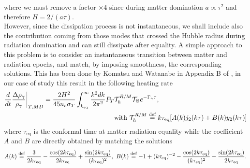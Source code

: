 where we must remove a factor $\times 4$ since during matter domination $a\propto \tau^2$ and therefore $H=2/(a\tau)$.\\
However, since the dissipation process is not instantaneous, we shall include also the contribution coming from those modes that crossed the Hubble radius during radiation domination and can still dissipate after equality. A simple approach to this problem is to consider an instantaneous transition between matter and radiation epochs, and match, by imposing smoothness, the corresponding solutions. This has been done by Komatsu and Watanabe in Appendix B of \cite{Watanabe_2006}, in our case of study this result in the following heating rate
\begin{align}
    \frac{d}{dt}\frac{\Delta\rho_\gamma}{\rho_\gamma}\bigg|_{T, MD}=\frac{2H^2}{45n_e\sigma_T}\int_{k_\text{eq}}^{\infty}\frac{k^2dk}{2\pi^2}{P}_T&\mathcal{T}_h^{R/M}\mathcal T_\Theta e^{-\Gamma_\gamma\tau},\\&\text{with }\mathcal{T}_h^{R/M}\stackrel{\text{def}}{=} k\tau_\text{eq} [A(k)j_2(k\tau)+B(k)y_2(k\tau)]\nonumber
\end{align}
where $\tau_\text{eq}$ is the conformal time at matter radiation equality while the coefficient $A$ and $B$ are directly obtained by matching the solutions
\begin{align*}
    A(k)\defeq \frac{3}{2k\tau_\text{eq}}-\frac{\cos(2k\tau_\text{eq})}{2k\tau_\text{eq}}+\frac{\sin(2k\tau_\text{eq})}{(k\tau_\text{eq})^2},\ B(k)\defeq -1 + (k\tau_\text{eq})^{-2} -\frac{\cos(2k\tau_\text{eq})}{(k\tau_\text{eq})^2}-\frac{\sin(2k\tau_\text{eq})}{2k\tau_\text{eq}}.
\end{align*}
